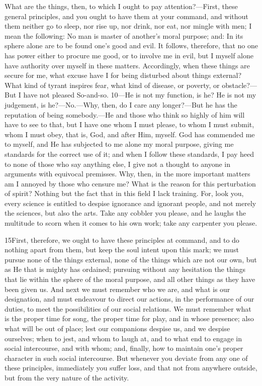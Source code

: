 What are the things, then, to which I ought to pay attention?—First, these general principles, and you ought to have them at your command, and without them neither go to sleep, nor rise up, nor drink, nor eat, nor mingle with men; I mean the following: No man is master of another's moral purpose; and: In its sphere alone are to be found one's good and evil. It follows, therefore, that no one has power either to procure me good, or to involve me in evil, but I myself alone have authority over myself in these matters. Accordingly, when these things are secure for me, what excuse have I for being disturbed about things external? What kind of tyrant inspires fear, what kind of disease, or poverty, or obstacle?—But I have not pleased So-and-so. 10—He is not my function, is he? He is not my judgement, is he?—No.—Why, then, do I care any longer?—But he has the reputation of being somebody.—He and those who think so highly of him will have to see to that, but I have one whom I must please, to whom I must submit, whom I must obey, that is, God, and after Him, myself. God has commended me to myself, and He has subjected to me alone my moral purpose, giving me standards for the correct use of it; and when I follow these standards, I pay heed to none of those who say anything else, I give not a thought to anyone in arguments with equivocal premisses. Why, then, in the more important matters am I annoyed by those who censure me? What is the reason for this perturbation of spirit? Nothing but the fact that in this field I lack training. For, look you, every science is entitled to despise ignorance and ignorant people, and not merely the sciences, but also the arts. Take any cobbler you please, and he laughs the multitude to scorn when it comes to his own work; take any carpenter you please.

15First, therefore, we ought to have these principles at command, and to do nothing apart from them, but keep the soul intent upon this mark; we must pursue none of the things external, none of the things which are not our own, but as He that is mighty has ordained; pursuing without any hesitation the things that lie within the sphere of the moral purpose, and all other things as they have been given us. And next we must remember who we are, and what is our designation, and must endeavour to direct our actions, in the performance of our duties, to meet the possibilities of our social relations. We must remember what is the proper time for song, the proper time for play, and in whose presence; also what will be out of place; lest our companions despise us, and we despise ourselves; when to jest, and whom to laugh at, and to what end to engage in social intercourse, and with whom; and, finally, how to maintain one's proper character in such social intercourse. But whenever you deviate from any one of these principles, immediately you suffer loss, and that not from anywhere outside, but from the very nature of the activity.


